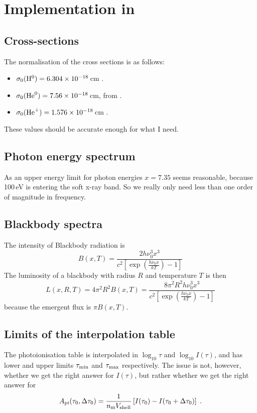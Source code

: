 \documentclass[a4paper,11pt]{article}
\begin{document}
\section{Implementation in \pion{}}


\subsection{Cross-sections}
The normalisation of the cross sections is as follows:
\begin{itemize}
\item $\sigma_0(\mathrm{H}^0)  = 6.304\times10^{-18}$\,cm \citep{Ost89}.
\item $\sigma_0(\mathrm{He}^0) = 7.56\times10^{-18}$\,cm, from \citet{MarWes76} \citep[via][]{VerFerKorEA96}.
\item $\sigma_0(\mathrm{He}^+) = 1.576\times10^{-18}$\,cm \citep{Ost89}.
\end{itemize}
These values should be accurate enough for what I need.

\subsection{Photon energy spectrum}
As an upper energy limit for photon energies $x=7.35$ seems reasonable, because 100\,eV is entering the soft x-ray band.
So we really only need less than one order of magnitude in frequency.


\subsection{Blackbody spectra}
The intensity of Blackbody radiation is \citep[e.g.][]{RybLig79}
\begin{equation}
B(x,T) = \frac{2h\nu_0^3x^3}{c^2\left[\exp\left(\frac{h\nu_0x}{kT}\right)-1\right]}
\end{equation}
The luminosity of a blackbody with radius $R$ and temperature $T$ is then
\begin{equation}
L(x,R,T) = 4\pi^2R^2B(x,T) =
\frac{8\pi^2R^2h\nu_0^3x^3}{c^2\left[\exp\left(\frac{h\nu_0x}{kT}\right)-1\right]}
\end{equation}
because the emergent flux is $\pi B(x,T)$.


\subsection{Limits of the interpolation table}
The photoionisation table is interpolated in $\log_{10}\tau$ and $\log_{10}I(\tau)$, and has lower and upper limits $\tau_{\mathrm{min}}$ and $\tau_{\mathrm{max}}$ respectively.
The issue is not, however, whether we get the right answer for $I(\tau)$, but rather whether we get the right answer for
\begin{equation}
A_{\mathrm{pi}}(\tau_0,\Delta\tau_0) = 
    \frac{1}{n_{\textsc{hi}}V_{\mathrm{shell}}}
    \left[I(\tau_0) - I(\tau_0+\Delta\tau_0)\right]  \;.
\label{eqn:pionFD}
\end{equation}
\end{document}
